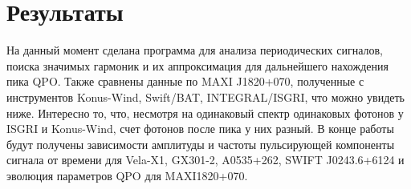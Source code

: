 \section*{Результаты}
	

	На данный момент сделана программа для анализа периодических сигналов, поиска значимых гармоник и их аппроксимация для дальнейшего нахождения пика QPO. Также сравнены данные по MAXI J1820+070, полученные с инструментов Konus-Wind, Swift/BAT, INTEGRAL/ISGRI, что можно увидеть ниже. Интересно то, что, несмотря на одинаковый спектр одинаковых фотонов у ISGRI и Konus-Wind, счет фотонов после пика у них разный. В конце работы будут получены зависимости амплитуды и частоты пульсирующей компоненты сигнала от времени для Vela-X1, GX301-2, A0535+262, SWIFT J0243.6+6124 и эволюция параметров QPO для MAXI1820+070.
	
